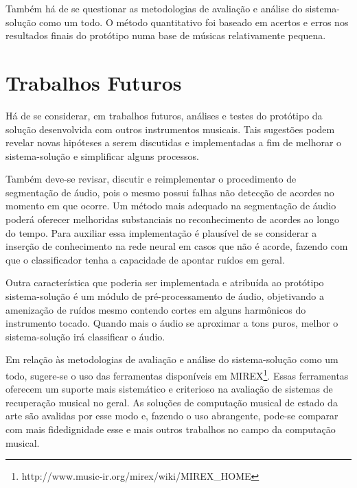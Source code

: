 Também há de se questionar as metodologias de avaliação e análise do sistema-solução como um todo. O método quantitativo foi baseado em acertos e erros nos resultados finais do protótipo numa base de músicas relativamente pequena.

\section{Trabalhos Futuros}

Há de se considerar, em trabalhos futuros, análises e testes do protótipo da solução desenvolvida com outros instrumentos musicais. Tais sugestões podem revelar novas hipóteses a serem discutidas e implementadas a fim de melhorar o sistema-solução e simplificar alguns processos.

Também deve-se revisar, discutir e reimplementar o procedimento de segmentação de áudio, pois o mesmo possui falhas não detecção de acordes no momento em que ocorre. Um método mais adequado na segmentação de áudio poderá oferecer melhoridas substanciais no reconhecimento de acordes ao longo do tempo. Para auxiliar essa implementação é plausível de se considerar a inserção de conhecimento na rede neural em casos que não é acorde, fazendo com que o classificador tenha a capacidade de apontar ruídos em geral.

Outra característica que poderia ser implementada e atribuída ao protótipo sistema-solução é um módulo de pré-processamento de áudio, objetivando a amenização de ruídos mesmo contendo cortes em alguns harmônicos do instrumento tocado. Quando mais o áudio se aproximar a tons puros, melhor o sistema-solução irá classificar o áudio.

Em relação às metodologias de avaliação e análise do sistema-solução como um todo, sugere-se o uso das ferramentas disponíveis em MIREX\footnote{http://www.music-ir.org/mirex/wiki/MIREX\_HOME}. Essas ferramentas oferecem um suporte mais sistemático e criterioso na avaliação de sistemas de recuperação musical no geral. As soluções de computação musical de estado da arte são avalidas por esse modo e, fazendo o uso abrangente, pode-se comparar com mais fidedignidade esse e mais outros trabalhos no campo da computação musical.